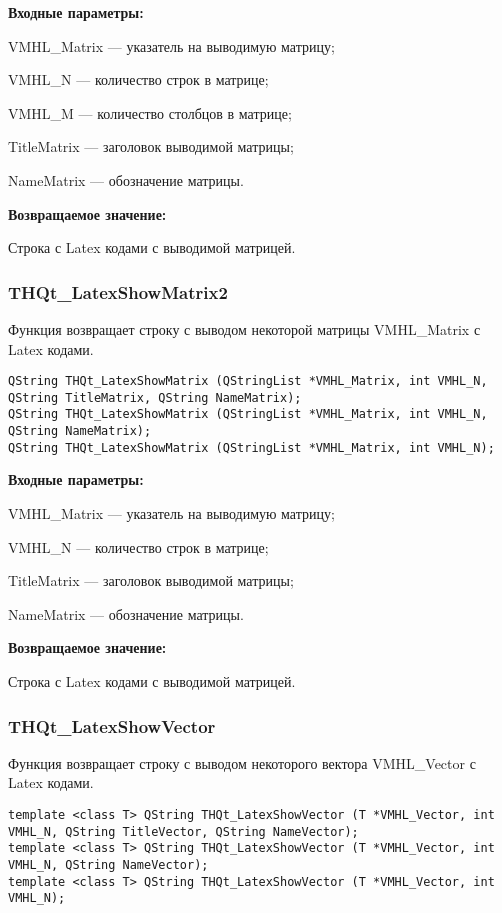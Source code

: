 \documentclass[a4paper,12pt]{article}
\begin{document}
\textbf{Входные параметры:}

VMHL\_Matrix --- указатель на выводимую матрицу;
 
VMHL\_N --- количество строк в матрице;
 
VMHL\_M --- количество столбцов в матрице;
 
TitleMatrix --- заголовок выводимой матрицы;
 
NameMatrix --- обозначение матрицы.
	
\textbf{Возвращаемое значение:}

Строка с Latex кодами с выводимой матрицей.


\subsubsection{THQt\_LatexShowMatrix2}\label{THQt_LatexShowMatrix2}

Функция возвращает строку с выводом некоторой матрицы VMHL\_Matrix с Latex кодами.


\begin{lstlisting}[label=code_syntax_THQt_LatexShowMatrix2,caption=Синтаксис]
QString THQt_LatexShowMatrix (QStringList *VMHL_Matrix, int VMHL_N, QString TitleMatrix, QString NameMatrix);
QString THQt_LatexShowMatrix (QStringList *VMHL_Matrix, int VMHL_N, QString NameMatrix);
QString THQt_LatexShowMatrix (QStringList *VMHL_Matrix, int VMHL_N);
\end{lstlisting}

\textbf{Входные параметры:}

    VMHL\_Matrix --- указатель на выводимую матрицу;
 
    VMHL\_N --- количество строк в матрице;
 
    TitleMatrix --- заголовок выводимой матрицы;
 
    NameMatrix --- обозначение матрицы.
	
\textbf{Возвращаемое значение:}

Строка с Latex кодами с выводимой матрицей.


\subsubsection{THQt\_LatexShowVector}\label{THQt_LatexShowVector}

Функция возвращает строку с выводом некоторого вектора VMHL\_Vector с Latex кодами.


\begin{lstlisting}[label=code_syntax_THQt_LatexShowVector,caption=Синтаксис]
template <class T> QString THQt_LatexShowVector (T *VMHL_Vector, int VMHL_N, QString TitleVector, QString NameVector);
template <class T> QString THQt_LatexShowVector (T *VMHL_Vector, int VMHL_N, QString NameVector);
template <class T> QString THQt_LatexShowVector (T *VMHL_Vector, int VMHL_N);
\end{lstlisting}
\end{document}
